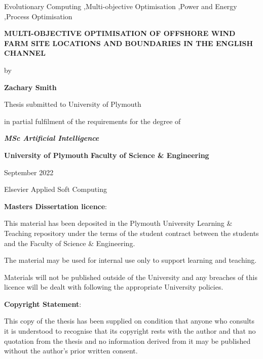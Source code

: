 \documentclass[preprint,12pt,authoryear]{elsarticle}
\begin{document}
\begin{frontmatter}
\begin{keyword}
Evolutionary Computing \sep Multi-objective Optimisation \sep Power and Energy \sep Process Optimisation
\end{keyword}

\clearpage

\begin{Center}
\textbf{MULTI-OBJECTIVE OPTIMISATION OF OFFSHORE WIND FARM SITE LOCATIONS AND BOUNDARIES IN THE ENGLISH CHANNEL}

by

\textbf{Zachary Smith}


Thesis submitted to University of Plymouth

in partial fulfilment of the requirements for the degree of


\textbf{\textit{MSc Artificial Intelligence}}


\textbf{University of Plymouth }
\textbf{Faculty of Science \& Engineering}


September 2022
\end{Center}

\vspace*{\fill} %
{\raggedleft Elsevier Applied Soft Computing\par}
\clearpage

\textbf{Masters Dissertation licence}:

This material has been deposited in the Plymouth University Learning \& Teaching repository under the terms of the student contract between the students and the Faculty of Science \& Engineering.

The material may be used for internal use only to support learning and teaching.

Materials will not be published outside of the University and any breaches of this licence will be dealt with following the appropriate University policies.

\textbf{Copyright Statement}:

This copy of the thesis has been supplied on condition that anyone who consults it is understood to
recognise that its copyright rests with the author and that no quotation from the thesis and no
information derived from it may be published without the author’s prior written consent.


\end{frontmatter}
\end{document}
